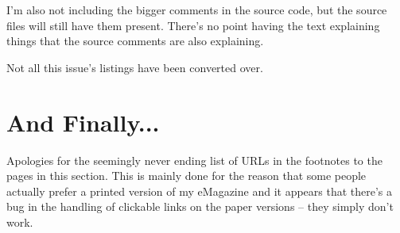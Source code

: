 I'm also not including the bigger comments in the source code, but
the source files will still have them present. There's no point having
the text explaining things that the source comments are also explaining.

Not all this issue's listings have been converted over.

\section{And Finally...}

Apologies for the seemingly never ending list of URLs in the footnotes
to the pages in this section. This is mainly done for the reason that
some people actually prefer a printed version of my eMagazine and
it appears that there's a bug in the handling of clickable links on
the paper versions -- they simply don't work.
